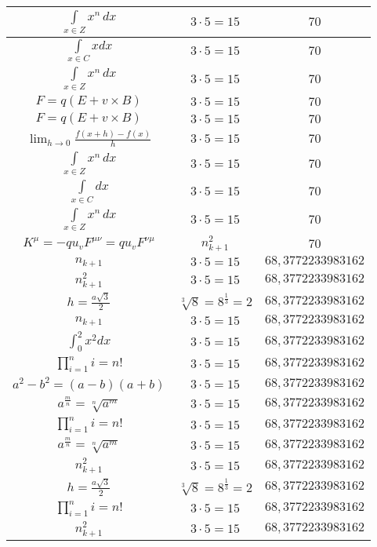 \documentclass{article}
\begin{document}
\begin{flushleft}
\begin{longtable}{|c|c|c|}
$\int \limits_{x\in Z}\!x^{n}\,dx$ & $3\cdot 5=15$ & $70$ \\ \hline 
$\int \limits_{x\in C}xdx$ & $3\cdot 5=15$ & $70$ \\ \hline 
$\int \limits_{x\in Z}\!x^{n}\,dx$ & $3\cdot 5=15$ & $70$ \\ \hline 
$F=q\left(E+v\times B\right)$ & $3\cdot 5=15$ & $70$ \\ \hline 
$F=q\left(E+v\times B\right)$ & $3\cdot 5=15$ & $70$ \\ \hline 
$\lim_{h\to0}\frac{f(x+h)-f(x)}{h}$ & $3\cdot 5=15$ & $70$ \\ \hline 
$\int \limits_{x\in Z}\!x^{n}\,dx$ & $3\cdot 5=15$ & $70$ \\ \hline 
$\int \limits_{x\in C}dx$ & $3\cdot 5=15$ & $70$ \\ \hline 
$\int \limits_{x\in Z}\!x^{n}\,dx$ & $3\cdot 5=15$ & $70$ \\ \hline 
$K^\mu=-qu_vF^{\mu\nu}=qu_vF^{\nu\mu}$ & $n_{k+1}^2$ & $70$ \\ \hline 
$n_{k+1}$ & $3\cdot 5=15$ & $68,3772233983162$ \\ \hline 
$n_{k+1}^2$ & $3\cdot 5=15$ & $68,3772233983162$ \\ \hline 
$h=\frac{a\sqrt{3}}{2}$ & $\sqrt[3]{8}=8^{\frac{1}{3}}=2$ & $68,3772233983162$ \\ \hline 
$n_{k+1}$ & $3\cdot 5=15$ & $68,3772233983162$ \\ \hline 
$\int _0^2x^2dx$ & $3\cdot 5=15$ & $68,3772233983162$ \\ \hline 
$\prod_{i=1}^ni=n!$ & $3\cdot 5=15$ & $68,3772233983162$ \\ \hline 
$a^2-b^2=(a-b)(a+b)$ & $3\cdot 5=15$ & $68,3772233983162$ \\ \hline 
$a^{\frac{m}{n}}=\sqrt[n]{a^{m}}$ & $3\cdot 5=15$ & $68,3772233983162$ \\ \hline 
$\prod_{i=1}^ni=n!$ & $3\cdot 5=15$ & $68,3772233983162$ \\ \hline 
$a^{\frac{m}{n}}=\sqrt[n]{a^{m}}$ & $3\cdot 5=15$ & $68,3772233983162$ \\ \hline 
$n_{k+1}^2$ & $3\cdot 5=15$ & $68,3772233983162$ \\ \hline 
$h=\frac{a\sqrt{3}}{2}$ & $\sqrt[3]{8}=8^{\frac{1}{3}}=2$ & $68,3772233983162$ \\ \hline 
$\prod_{i=1}^ni=n!$ & $3\cdot 5=15$ & $68,3772233983162$ \\ \hline 
$n_{k+1}^2$ & $3\cdot 5=15$ & $68,3772233983162$ \\ \hline 

\end{longtable}
\end{flushleft}
\end{document}
